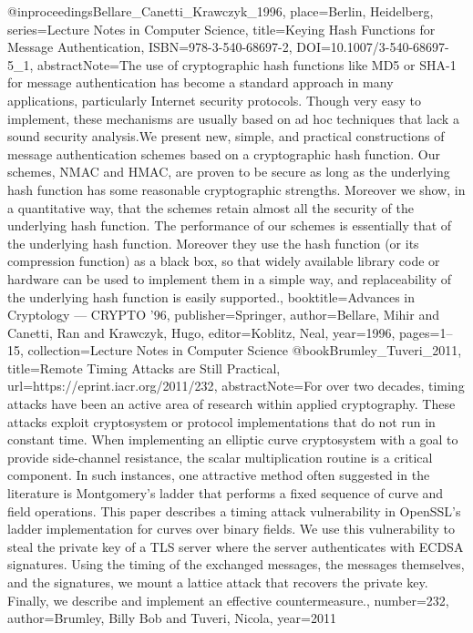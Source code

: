  @inproceedings{Bellare_Canetti_Krawczyk_1996, place={Berlin, Heidelberg}, series={Lecture Notes in Computer Science}, title={Keying Hash Functions for Message Authentication}, ISBN={978-3-540-68697-2}, DOI={10.1007/3-540-68697-5_1}, abstractNote={The use of cryptographic hash functions like MD5 or SHA-1 for message authentication has become a standard approach in many applications, particularly Internet security protocols. Though very easy to implement, these mechanisms are usually based on ad hoc techniques that lack a sound security analysis.We present new, simple, and practical constructions of message authentication schemes based on a cryptographic hash function. Our schemes, NMAC and HMAC, are proven to be secure as long as the underlying hash function has some reasonable cryptographic strengths. Moreover we show, in a quantitative way, that the schemes retain almost all the security of the underlying hash function. The performance of our schemes is essentially that of the underlying hash function. Moreover they use the hash function (or its compression function) as a black box, so that widely available library code or hardware can be used to implement them in a simple way, and replaceability of the underlying hash function is easily supported.}, booktitle={Advances in Cryptology — CRYPTO ’96}, publisher={Springer}, author={Bellare, Mihir and Canetti, Ran and Krawczyk, Hugo}, editor={Koblitz, Neal}, year={1996}, pages={1–15}, collection={Lecture Notes in Computer Science} }
 @book{Brumley_Tuveri_2011, title={Remote Timing Attacks are Still Practical}, url={https://eprint.iacr.org/2011/232}, abstractNote={For over two decades, timing attacks have been an active area of research within applied cryptography. These attacks exploit cryptosystem or protocol implementations that do not run in constant time. When implementing an elliptic curve cryptosystem with a goal to provide side-channel resistance, the scalar multiplication routine is a critical component. In such instances, one attractive method often suggested in the literature is Montgomery’s ladder that performs a fixed sequence of curve and field operations. This paper describes a timing attack vulnerability in OpenSSL’s ladder implementation for curves over binary fields. We use this vulnerability to steal the private key of a TLS server where the server authenticates with ECDSA signatures. Using the timing of the exchanged messages, the messages themselves, and the signatures, we mount a lattice attack that recovers the private key. Finally, we describe and implement an effective countermeasure.}, number={232}, author={Brumley, Billy Bob and Tuveri, Nicola}, year={2011} }
